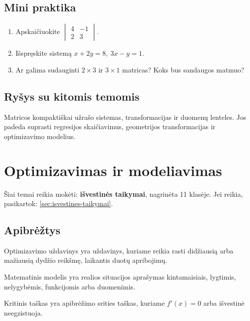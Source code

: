 \subsection{Mini praktika}
\begin{enumerate}[label=\alph*)]
\item Apskaičiuokite \(\begin{vmatrix}4&-1\\2&3\end{vmatrix}\).
\item Išspręskite sistemą \(x+2y=8,\ 3x-y=1\).
\item Ar galima sudauginti \(2\times3\) ir \(3\times1\) matricas? Koks bus sandaugos matmuo?
\end{enumerate}

\subsection{Ryšys su kitomis temomis}
Matricos kompaktiškai užrašo sistemas, transformacijas ir duomenų lenteles. Jos padeda suprasti regresijos skaičiavimus, geometrijos transformacijas ir optimizavimo modelius.

\section{Optimizavimas ir modeliavimas}\label{sec:optimizavimas-ir-modeliavimas}

\begin{tcolorbox}[title=Primename iš ankstesnių klasių, colback=yellow!10]
Šiai temai reikia mokėti: \textbf{išvestinės taikymai}, nagrinėta 11 klasėje.
Jei reikia, pasikartok: \ref{sec:isvestines-taikymai}.
\end{tcolorbox}

\subsection{Apibrėžtys}
\begin{apibreztis}
Optimizavimo uždavinys yra uždavinys, kuriame reikia rasti didžiausią arba mažiausią dydžio reikšmę, laikantis duotų apribojimų.
\end{apibreztis}
\begin{apibreztis}
Matematinis modelis yra realios situacijos aprašymas kintamaisiais, lygtimis, nelygybėmis, funkcijomis arba duomenimis.
\end{apibreztis}
\begin{apibreztis}
Kritinis taškas yra apibrėžimo srities taškas, kuriame \(f'(x)=0\) arba išvestinė neegzistuoja.
\end{apibreztis}

